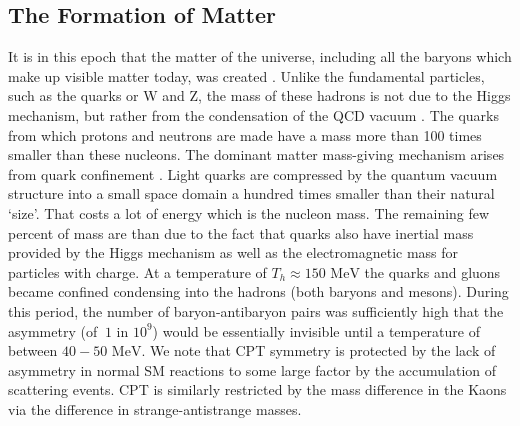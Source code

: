 \documentclass[universe,article,submit,moreauthors,pdftex,a4paper]{Definitions/mdpi}
\newcommand{\MeV}{\text{ MeV}}
\begin{document}
\subsection{The Formation of Matter}\label{sec:Creation}
\noindent It is in this epoch that the matter of the universe, including all the baryons which make up visible matter today, was created \cite{Fromerth:2002wb,Rafelski:2019twp}. Unlike the fundamental particles, such as the quarks or W and Z, the mass of these hadrons is not due to the Higgs mechanism, but rather from the condensation of the QCD vacuum \cite{Rafelski:2015cxa,Roberts:2021xnz,Roberts:2022rxm}. The quarks from which protons and neutrons are made have a mass more than 100 times smaller than these nucleons. The dominant matter mass-giving mechanism arises from quark confinement \cite{Hagedorn:1984hz}. Light quarks are compressed by the quantum vacuum structure into a small space domain a hundred times smaller than their natural `size'. That costs a lot of energy which is the nucleon mass. The remaining few percent of mass are than due to the fact that quarks also have inertial mass provided by the Higgs mechanism as well as the electromagnetic mass for particles with charge. At a temperature of $T_{h}\approx150\MeV$ the quarks and gluons became confined condensing into the hadrons (both baryons and mesons). During this period, the number of baryon-antibaryon pairs was sufficiently high that the asymmetry (of $~1$ in $10^{9}$) would be essentially invisible until a temperature of between $40-50\MeV$. We note that CPT symmetry is protected by the lack of asymmetry in normal SM reactions to some large factor by the accumulation of scattering events. CPT is similarly restricted by the mass difference in the Kaons via the difference in strange-antistrange masses.
\end{document}
